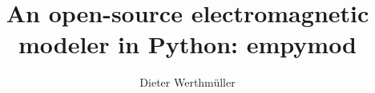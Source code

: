 \documentclass[manuscript,revised]{geophysics}
\begin{document}
\title{An open-source electromagnetic modeler in Python: empymod}

\renewcommand{\thefootnote}{1}%


\address{Instituto Mexicano del Petróleo,
         Eje Central Lázaro Cárdenas Norte 152,
         Col. San Bartolo Atepehuacan C.P. 07730,
         Ciudad de México, México.
         E-mail: \href{mailto:dieter@werthmuller.org}{Dieter@Werthmuller.org}.}

\author{Dieter Werthmüller\footnotemark[1]}

\footer{}

\maketitle
\end{document}
